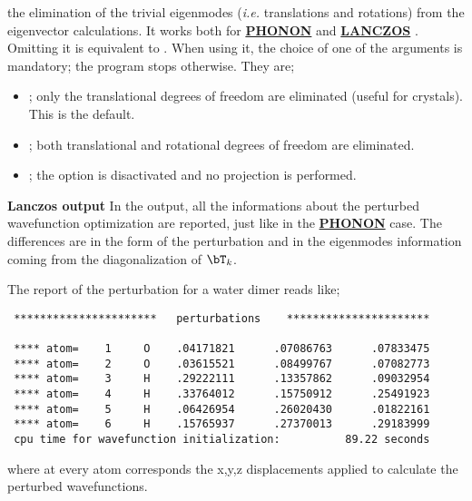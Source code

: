\documentclass[twoside,10pt,titlepage,a4paper]{article}
\newcommand{\referto}[2]{\hyperlink{#1}{#2}}
\newcommand{\referto}[2]{\htmlref{#2}{#1}}
\newcommand{\refkeyword}[1]{%
\referto{#1}{\textbf{#1}}%
\index{#1}%
}%
\begin{document}
\begin{itemize}
the elimination of the trivial eigenmodes ({\em i.e.} translations and
rotations) from the eigenvector calculations. It works both for
\refkeyword{PHONON} and \refkeyword{LANCZOS}. Omitting it is equivalent
to .
When using it, the choice of one of the arguments is mandatory; the
program stops otherwise. They are;
\begin{itemize}
\item {}; only the translational degrees of freedom are
eliminated (useful for crystals). This is the default.
\item {}; both translational and rotational degrees of
freedom are eliminated.
\item {}; the option is disactivated and no projection is
performed.
\end{itemize}

\end{itemize}


\textbf{Lanczos output}
In the output, all the informations about the perturbed wavefunction
optimization are reported, just like in the \refkeyword{PHONON} case. The
differences are in the form of the perturbation and in the eigenmodes
information coming from the diagonalization of $\bT_k$.


The report of the perturbation for a water dimer reads like;
\verbatimsize\begin{verbatim}
 **********************   perturbations    **********************

 **** atom=    1     O    .04171821      .07086763      .07833475
 **** atom=    2     O    .03615521      .08499767      .07082773
 **** atom=    3     H    .29222111      .13357862      .09032954
 **** atom=    4     H    .33764012      .15750912      .25491923
 **** atom=    5     H    .06426954      .26020430      .01822161
 **** atom=    6     H    .15765937      .27370013      .29183999
 cpu time for wavefunction initialization:          89.22 seconds
\end{verbatim}\eofverbsize
where at every atom corresponds the x,y,z displacements applied to calculate
the perturbed wavefunctions.
\end{document}
